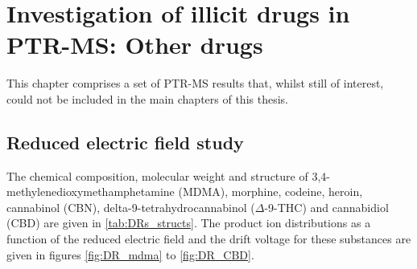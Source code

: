 \chapter{Investigation of illicit drugs in PTR-MS: Other drugs}\label{chapter:drugs}

This chapter comprises a set of PTR-MS results that, whilst still of interest, could not be included in the main chapters of this thesis.


\section{Reduced electric field study}
The chemical composition, molecular weight and structure of 
3,4-methylenedioxymethamphetamine (MDMA),
morphine, 
codeine, 
heroin, 
cannabinol (CBN), 
delta-9-tetrahydrocannabinol ($\Delta$-9-THC)
and 
cannabidiol (CBD)
are given in \autoref{tab:DRs_structs}.
%
The product ion distributions as a function of the reduced electric field and the drift voltage for these substances are given in  figures \ref{fig:DR_mdma} to \ref{fig:DR_CBD}.







